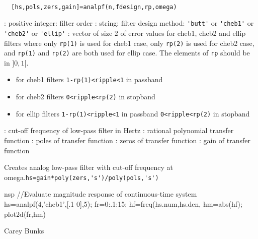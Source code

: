 \begin{mandesc}
   \\ %
\end{mandesc}
\begin{calling_sequence}
\begin{verbatim}
  [hs,pols,zers,gain]=analpf(n,fdesign,rp,omega)  
\end{verbatim}
\end{calling_sequence}
\begin{parameters}
  \begin{varlist}
    : positive integer: filter order
    : string: filter design method: \verb!'butt'! or
    \verb!'cheb1'! or \verb!'cheb2'! or \verb!'ellip'!
    : vector of size $2$ of error values for cheb1, cheb2 and ellip
    filters where only \verb!rp(1)! is used for cheb1 case, only \verb!rp(2)! is
    used for cheb2 case, and \verb!rp(1)! and \verb!rp(2)! are both used for
    ellip case. The elements of \verb!rp! should be in $]0,1[$.
    \begin{itemize}
    \item for cheb1 filters \verb!1-rp(1)<ripple<1! in passband
    \item for cheb2 filters \verb!0<ripple<rp(2)! in stopband
    \item for ellip filters \verb!1-rp(1)<ripple<1! in passband 
      \verb!0<ripple<rp(2)! in stopband
    \end{itemize}
    : cut-off frequency of low-pass filter in Hertz
    : rational polynomial transfer function
    : poles of transfer function
    : zeros of transfer function
    : gain of transfer function
  \end{varlist}
\end{parameters}
\begin{mandescription}
  Creates analog low-pass filter with cut-off frequency at
  omega.\verb!hs=gain*poly(zers,'s')/poly(pols,'s')!
\end{mandescription}
\begin{examples}
  \begin{mintednsp}{nsp}
    //Evaluate magnitude response of continuous-time system 
    hs=analpf(4,'cheb1',[.1 0],5);
    fr=0:.1:15;
    hf=freq(hs.num,hs.den,%
    hm=abs(hf);
    plot2d(fr,hm)
  \end{mintednsp}
\end{examples}
\begin{authors}
  Carey Bunks  
\end{authors}
